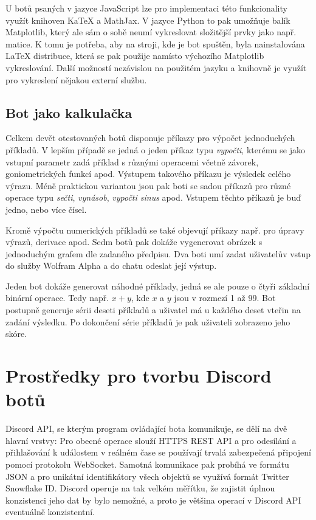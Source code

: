 \documentclass[FM]{tulthesis}
\begin{document}
	U botů psaných v jazyce JavaScript lze pro implementaci této funkcionality využít knihoven KaTeX a MathJax. V jazyce Python to pak umožňuje balík Matplotlib, který ale sám o sobě neumí vykreslovat složitější prvky jako např. matice. K tomu je potřeba, aby na stroji, kde je bot spuštěn, byla nainstalována LaTeX distribuce, která se pak použije namísto výchozího Matplotlib vykreslování. Další možností nezávislou na použitém jazyku a knihovně je využít pro vykreslení nějakou externí službu.
	
	\section{Bot jako kalkulačka}
	
	Celkem devět otestovaných botů disponuje příkazy pro výpočet jednoduchých příkladů. V lepším případě se jedná o jeden příkaz typu \textit{vypočti}, kterému se jako vstupní parametr zadá příklad s různými operacemi včetně závorek, goniometrických funkcí apod. Výstupem takového příkazu je výsledek celého výrazu. Méně praktickou variantou jsou pak boti se sadou příkazů pro různé operace typu \textit{sečti}, \textit{vynásob}, \textit{vypočti sinus} apod. Vstupem těchto příkazů je buď jedno, nebo více čísel.
	
	Kromě výpočtu numerických příkladů se také objevují příkazy např. pro úpravy výrazů, derivace apod. Sedm botů pak dokáže vygenerovat obrázek s jednoduchým grafem dle zadaného předpisu. Dva boti umí zadat uživatelův vstup do služby Wolfram Alpha a do chatu odeslat její výstup.
	
	Jeden bot dokáže generovat náhodné příklady, jedná se ale pouze o čtyři základní binární operace. Tedy např. $x+y$, kde $x$ a $y$ jsou v rozmezí 1 až 99. Bot postupně generuje sérii deseti příkladů a uživatel má u každého deset vteřin na zadání výsledku. Po dokončení série příkladů je pak uživateli zobrazeno jeho skóre.
	
	
	\chapter{Prostředky pro tvorbu Discord botů}\label{Chapter4}
		
	Discord API, se kterým program ovládající bota komunikuje, se dělí na dvě hlavní vrstvy: Pro obecné operace slouží HTTPS REST API a pro odesílání a přihlašování k událostem v reálném čase se používají trvalá zabezpečená připojení pomocí protokolu WebSocket. Samotná komunikace pak probíhá ve formátu JSON a pro unikátní identifikátory všech objektů se využívá formát Twitter Snowflake ID. \mbox{Discord} operuje na tak velkém měřítku, že zajistit úplnou konzistenci jeho dat by bylo nemožné, a proto je většina operací v Discord API eventuálně konzistentní. \cite{doc_Discord}
	
\end{document}
